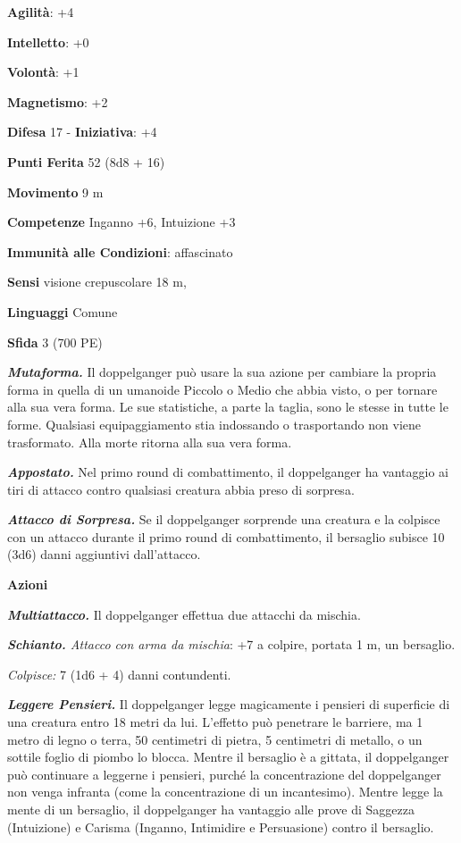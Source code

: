 \begin{multicols}{2}
\textbf{Agilità}: +4

\textbf{Intelletto}: +0

\textbf{Volontà}: +1

\textbf{Magnetismo}: +2

\textbf{Difesa} 17 - \textbf{Iniziativa}: +4

\textbf{Punti Ferita} 52 (8d8 + 16)

\textbf{Movimento} 9 m

\textbf{Competenze} Inganno +6, Intuizione +3

\textbf{Immunità alle Condizioni}: affascinato

\textbf{Sensi} visione crepuscolare 18 m, 

\textbf{Linguaggi} Comune

\textbf{Sfida} 3 (700 PE)\smallskip

\emph{\textbf{Mutaforma.}} Il doppelganger può usare la sua azione per
cambiare la propria forma in quella di un umanoide Piccolo o Medio che
abbia visto, o per tornare alla sua vera forma. Le sue statistiche, a
parte la taglia, sono le stesse in tutte le forme. Qualsiasi
equipaggiamento stia indossando o trasportando non viene trasformato.
Alla morte ritorna alla sua vera forma.

\emph{\textbf{Appostato.}} Nel primo round di combattimento, il
doppelganger ha vantaggio ai tiri di attacco contro qualsiasi creatura
abbia preso di sorpresa.

\emph{\textbf{Attacco di Sorpresa.}} Se il doppelganger sorprende una
creatura e la colpisce con un attacco durante il primo round di
combattimento, il bersaglio subisce 10 (3d6) danni aggiuntivi
dall'attacco.

\smallskip\textbf{Azioni}

\emph{\textbf{Multiattacco.}} Il doppelganger effettua due attacchi da
mischia.

\emph{\textbf{Schianto.} Attacco con arma da mischia}: +7 a colpire,
portata 1 m, un bersaglio.

\emph{Colpisce:} 7 (1d6 + 4) danni contundenti.

\emph{\textbf{Leggere Pensieri.}} Il doppelganger legge magicamente i
pensieri di superficie di una creatura entro 18 metri da lui. L'effetto
può penetrare le barriere, ma 1 metro di legno o terra, 50 centimetri di
pietra, 5 centimetri di metallo, o un sottile foglio di piombo lo
blocca. Mentre il bersaglio è a gittata, il doppelganger può continuare
a leggerne i pensieri, purché la concentrazione del doppelganger non
venga infranta (come la concentrazione di un incantesimo). Mentre legge
la mente di un bersaglio, il doppelganger ha vantaggio alle prove di
Saggezza (Intuizione) e Carisma (Inganno, Intimidire e Persuasione)
contro il bersaglio.


\end{multicols}

